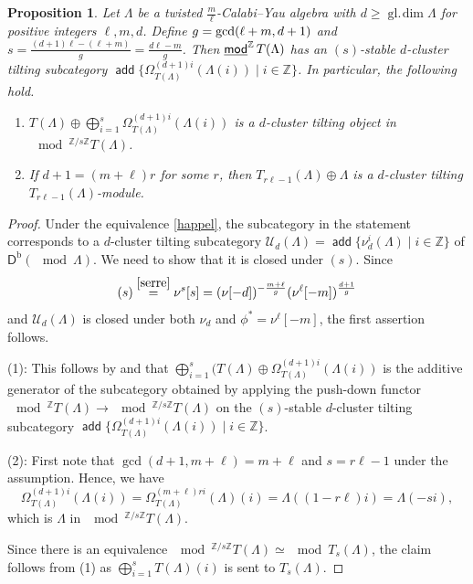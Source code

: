 \documentclass[a4paper,reqno,11pt]{amsart}
\newtheorem{proposition}[theorem]{Proposition}
\theoremstyle{definition}
\newcommand{\DDD}{\mathsf{D}}
\newcommand{\UU}{\mathcal{U}}
\newcommand{\Z}{\mathbb{Z}}
\newcommand{\bo}{\operatorname{b}\nolimits}
\newcommand{\gl}{\operatorname{gl.\!dim}\nolimits}
\DeclareMathOperator{\add}{\mathsf{add}}
\newcommand{\stmod}{\mathop{\underline{\mod}}\nolimits}
\numberwithin{equation}{section}
\begin{document}
\begin{proposition}\label{DI2.9}
  Let $\Lambda$ be a twisted $\frac{m}{\ell}$-Calabi--Yau algebra with $d\ge \gl\Lambda$
  for positive integers $\ell,m,d$.  Define $g={\rm gcd}(\ell+m,d+1)$ and $s=\frac{(d+1)\ell-(\ell+m)}{g}=\frac{d\ell-m}{g}$. 
Then $\stmod^\Z T(\Lambda)$ has an \emph{$(s)$-stable} $d$-cluster tilting subcategory $\add\{\Omega_{T(\Lambda)}^{(d+1)i}(\Lambda(i))\mid i\in\Z\}$.
In particular, the following hold.
\begin{enumerate}[(1)]
\item $T(\Lambda)\oplus \bigoplus_{i=1}^s \Omega_{T(\Lambda)}^{(d+1)i}(\Lambda(i))$ is a $d$-cluster tilting object in $\mod^{\Z/s\Z} T(\Lambda)$.

\item If $d+1=(m+\ell)r$ for some $r$, then $T_{r\ell-1}(\Lambda)\oplus \Lambda$ is a $d$-cluster tilting $T_{r\ell-1}(\Lambda)$-module. 
\end{enumerate} 
 
\end{proposition}
\begin{proof}
Under the equivalence \eqref{happel}, the subcategory in the statement corresponds to a $d$-cluster tilting subcategory $\UU_d(\Lambda)=\add\{\nu_d^i(\Lambda)\mid i\in\Z\}$ of $\DDD^{\bo}(\mod\Lambda)$.
We need to show that it is closed under $(s)$. Since
\[(s)\stackrel{\eqref{serre}}{=}\nu^s[s]=(\nu[-d])^{-\frac{m+\ell}{g}}(\nu^\ell[-m])^{\frac{d+1}{g}}\]
and $\UU_d(\Lambda)$ is closed under both $\nu_d$ and $\phi^*=\nu^\ell[-m]$, the first assertion follows.

(1): This follows by \cite[2.14(a)]{DI} and that $\bigoplus_{i=1}^s (T(\Lambda)\oplus \Omega_{T(\Lambda)}^{(d+1)i}(\Lambda(i))$ is the additive generator of the subcategory obtained by applying the push-down functor $\mod^{\Z}T(\Lambda)\to  \mod^{\Z/s\Z}T(\Lambda)$ on the $(s)$-stable $d$-cluster tilting subcategory $\add\{\Omega_{T(\Lambda)}^{(d+1)i}(\Lambda(i))\mid i\in\Z\}$.

(2):  First note that $\gcd(d+1,m+\ell)=m+\ell$ and $s=r\ell-1$ under the assumption.  Hence, we have
\[
\Omega_{T(\Lambda)}^{(d+1)i}(\Lambda(i)) = \Omega_{T(\Lambda)}^{(m+\ell)ri}(\Lambda)(i) = \Lambda((1-r\ell)i) = \Lambda(-si),
\]
which is $\Lambda$ in $\mod^{\Z/s\Z} T(\Lambda)$.

Since there is an equivalence $\mod^{\Z/s\Z}T(\Lambda)\simeq \mod T_s(\Lambda)$, the claim follows from (1) as $\bigoplus_{i=1}^s T(\Lambda)(i)$ is sent to $T_s(\Lambda)$.
\end{proof}
\end{document}
